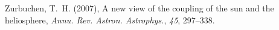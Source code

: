 \documentclass[draft,jgrga]{agutex}
\begin{document}
\begin{article}
\begin{thebibliography}{27}
Zurbuchen, T.~H. (2007), A new view of the coupling of the sun and the
  heliosphere, \textit{Annu. Rev. Astron. Astrophys.}, \textit{45}, 297--338.

\end{thebibliography}

\end{article}





%
%
%
%
%
%
%
%
%






\end{document}
